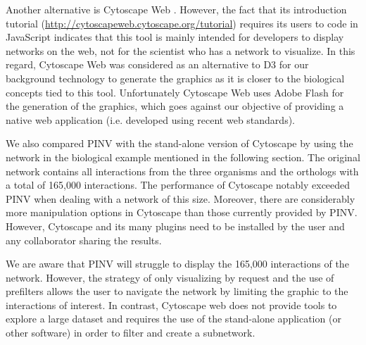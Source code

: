 Another alternative is Cytoscape Web \cite{LOP2010}. However, the fact that its introduction tutorial (\url{http://cytoscapeweb.cytoscape.org/tutorial}) requires its users to code in JavaScript indicates that this tool is mainly intended for developers to display networks on the web, not for the scientist who has a network to visualize. In this regard, Cytoscape Web was considered as an alternative to D3 for our background technology to generate the graphics as it is closer to the biological concepts tied to this tool. Unfortunately Cytoscape Web uses Adobe Flash for the generation of the graphics, which goes against our objective of providing a native web application (i.e. developed using recent web standards). 

We also compared PINV with the stand-alone version of Cytoscape by using the network in the biological example mentioned in the following section. The original network contains all interactions from the three organisms and the orthologs with a total of 165,000 interactions. 
The performance of Cytoscape notably exceeded PINV when dealing with a network of this size. Moreover, there are considerably more manipulation options in Cytoscape than those currently provided by PINV. However, Cytoscape and its many plugins need to be installed by the user and any collaborator sharing the results.

We are aware that PINV will struggle to display the 165,000 interactions of the network. However, the strategy of only visualizing by request and the use of prefilters  allows the user to navigate the network by limiting the graphic to the interactions of interest. In contrast, Cytoscape web does not provide tools to explore a large dataset and requires the use of the stand-alone application (or other software) in order to filter and create a subnetwork.

